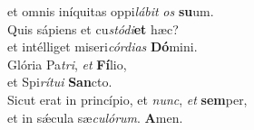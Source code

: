 \evenverse et omnis iníquitas oppi\textit{lá}\textit{bit} \textit{os} \textbf{su}um.\\
\oddverse Quis sápiens et cu\textit{stó}\textit{di}\textbf{et} hæc?~\*\\
\oddverse et intélliget miseri\textit{cór}\textit{di}\textit{as} \textbf{Dó}mini.\\
\evenverse Glória Pa\textit{tri}, \textit{et} \textbf{Fí}lio,~\*\\
\evenverse et Spi\textit{rí}\textit{tu}\textit{i} \textbf{San}cto.\\
\oddverse Sicut erat in princípio, et \textit{nunc}, \textit{et} \textbf{sem}per,~\*\\
\oddverse et in sǽcula sæ\textit{cu}\textit{ló}\textit{rum}. \textbf{A}men.\\
